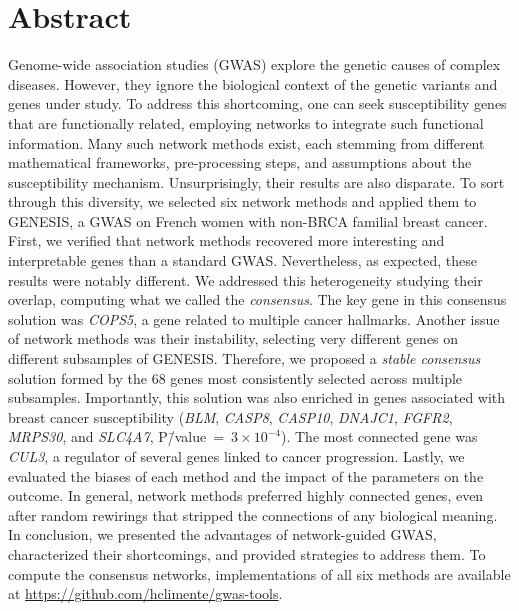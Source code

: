 \documentclass[10pt,letterpaper]{article}
\begin{document}
\section*{Abstract}
Genome-wide association studies (GWAS) explore the genetic causes of complex diseases. However, they ignore the biological context of the genetic variants and genes under study. To address this shortcoming, one can seek susceptibility genes that are functionally related, employing networks to integrate such functional information. Many such network methods exist, each stemming from different mathematical frameworks, pre-processing steps, and assumptions about the susceptibility mechanism. Unsurprisingly, their results are also disparate. To sort through this diversity, we selected six network methods and applied them to GENESIS, a GWAS on French women with non-BRCA familial breast cancer. First, we verified that network methods recovered more interesting and interpretable genes than a standard GWAS. Nevertheless, as expected, these results were notably different. We addressed this heterogeneity studying their overlap, computing what we called the \emph{consensus}. The key gene in this consensus solution was \emph{COPS5}, a gene related to multiple cancer hallmarks. Another issue of network methods was their instability, selecting very different genes on different subsamples of GENESIS. Therefore, we proposed a \emph{stable consensus} solution formed by the 68 genes most consistently selected across multiple subsamples. Importantly, this solution was also enriched in genes associated with breast cancer susceptibility (\emph{BLM}, \emph{CASP8}, \emph{CASP10}, \emph{DNAJC1}, \emph{FGFR2}, \emph{MRPS30}, and \emph{SLC4A7}, P\=/value~=~$3 \times 10^{-4}$). The most connected gene was \emph{CUL3}, a regulator of several genes linked to cancer progression. Lastly, we evaluated the biases of each method and the impact of the parameters on the outcome. In general, network methods preferred highly connected genes, even after random rewirings that stripped the connections of any biological meaning. In conclusion, we presented the advantages of network-guided GWAS, characterized their shortcomings, and provided strategies to address them. To compute the consensus networks, implementations of all six methods are available at \url{https://github.com/hclimente/gwas-tools}.

\end{document}
